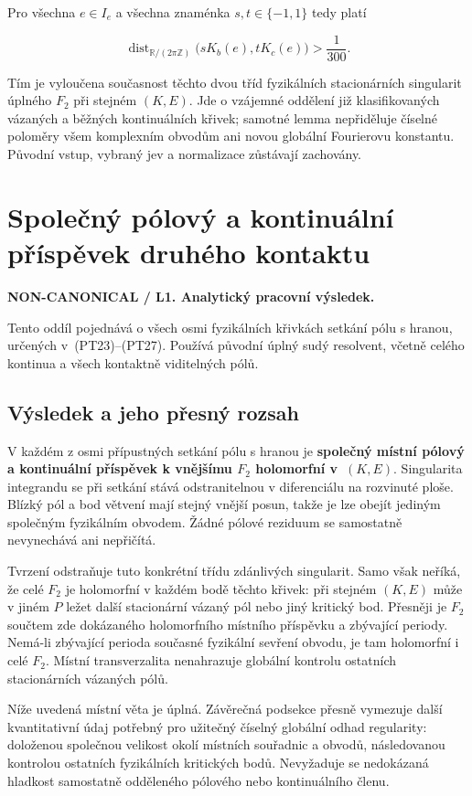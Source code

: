\documentclass[11pt,a4paper]{article}
\theoremstyle{remark}\newtheorem{remark}[theorem]{Poznámka}
\numberwithin{equation}{section}
\begin{document}
Pro všechna \(e\in I_e\) a všechna znaménka \(s,t\in\{-1,1\}\) tedy
platí

\[
\boxed{
\operatorname{dist}_{\mathbb R/(2\pi\mathbb Z)}
\bigl(sK_b(e),tK_c(e)\bigr)>\frac1{300}.
}
\tag{CS12}
\]

Tím je vyloučena současnost těchto dvou tříd fyzikálních stacionárních
singularit úplného \(F_2\) při stejném \((K,E)\). Jde o vzájemné
oddělení již klasifikovaných vázaných a běžných kontinuálních křivek;
samotné lemma nepřiděluje číselné poloměry všem komplexním obvodům ani
novou globální Fourierovu konstantu. Původní vstup, vybraný jev a
normalizace zůstávají zachovány.

\section{Společný pólový a kontinuální příspěvek druhého kontaktu}

\textbf{NON-CANONICAL / L1. Analytický pracovní výsledek.}

Tento oddíl pojednává o všech osmi fyzikálních křivkách setkání pólu
s hranou, určených v~(PT23)--(PT27). Používá původní úplný sudý
resolvent, včetně celého kontinua a všech kontaktně viditelných pólů.

\subsection{Výsledek a jeho přesný rozsah}

V každém z osmi přípustných setkání pólu s hranou je
\textbf{společný místní pólový a kontinuální příspěvek k vnějšímu
\(F_2\) holomorfní v~\((K,E)\)}. Singularita integrandu se při
setkání stává odstranitelnou v diferenciálu na rozvinuté ploše.
Blízký pól a bod větvení mají stejný vnější posun, takže je lze
obejít jediným společným fyzikálním obvodem. Žádné pólové reziduum
se samostatně nevynechává ani nepřičítá.

Tvrzení odstraňuje tuto konkrétní třídu zdánlivých singularit.
Samo však neříká, že celé \(F_2\) je holomorfní v každém bodě
těchto křivek: při stejném \((K,E)\) může v jiném \(P\) ležet
další stacionární vázaný pól nebo jiný kritický bod. Přesněji je
\(F_2\) součtem zde dokázaného holomorfního místního příspěvku
a zbývající periody. Nemá-li zbývající perioda současné fyzikální
sevření obvodu, je tam holomorfní i celé \(F_2\). Místní
transverzalita nenahrazuje globální kontrolu ostatních stacionárních
vázaných pólů.

Níže uvedená místní věta je úplná. Závěrečná podsekce přesně
vymezuje další kvantitativní údaj potřebný pro užitečný číselný
globální odhad regularity: doloženou společnou velikost okolí
místních souřadnic a obvodů, následovanou kontrolou ostatních
fyzikálních kritických bodů. Nevyžaduje se nedokázaná hladkost
samostatně odděleného pólového nebo kontinuálního členu.
\end{document}
